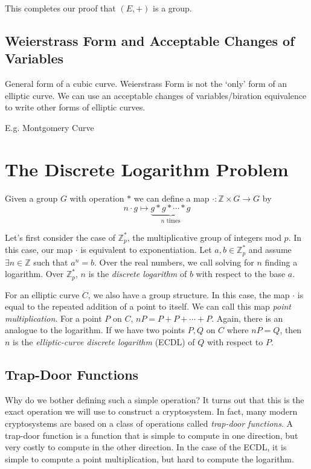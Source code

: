 \documentclass{article}
\begin{document}
This completes our proof that $(E,+)$ is a group.

\subsection{Weierstrass Form and Acceptable Changes of Variables}
General form of a cubic curve.
Weierstrass Form is not the `only' form of an elliptic curve. 
We can use an acceptable changes of variables/biration equivalence to write other forms of elliptic curves.

E.g. Montgomery Curve

\clearpage

\section{The Discrete Logarithm Problem}
Given a group $G$ with operation $*$ we can define a map $\cdot: \mathbb{Z} \times G \to G$ by
$$n\cdot g \mapsto \underbrace{g * g * \cdots * g}_{n\text{ times}}$$

Let's first consider the case of $\mathbb{Z}_p^*$, the multiplicative group of integers mod $p$.
In this case, our map $\cdot$ is equivalent to exponentiation.
Let $a,b \in \mathbb{Z}_p^*$ and assume $\exists n \in \mathbb{Z}$ such that $a^n = b$.
Over the real numbers, we call solving for $n$ finding a logarithm. Over $\mathbb{Z}_p^*$, $n$ is the \textit{discrete logarithm} of $b$ with respect to the base $a$.

For an elliptic curve $C$, we also have a group structure. 
In this case, the map $\cdot$ is equal to the repeated addition of a point to itself. 
We can call this map \textit{point multiplication}.
For a point $P$ on $C$, $nP = P + P + \cdots + P$.
Again, there is an analogue to the logarithm.
If we have two points $P,Q$ on $C$ where $nP = Q$, then $n$ is the \textit{elliptic-curve discrete logarithm} (ECDL) of $Q$ with respect to $P$.

\subsection{Trap-Door Functions}
Why do we bother defining such a simple operation?
It turns out that this is the exact operation we will use to construct a cryptosystem.
In fact, many modern cryptosystems are based on a class of operations called \textit{trap-door functions}.
A trap-door function is a function that is simple to compute in one direction, but very costly to compute in the other direction.
In the case of the ECDL, it is simple to compute a point multiplication, but hard to compute the logarithm.
\end{document}
